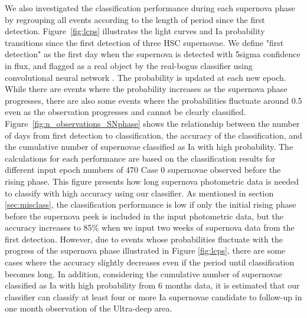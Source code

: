 \documentclass[useamsfonts]{pasj01}
\begin{document}
We also investigated the classification performance during each supernova phase by regrouping all events according to the length of period since the first detection.
Figure\ \ref{fig:lcps} illustrates the light curves and Ia probability transitions since the first detection of three HSC supernovae.
We define "first detection" as the first day when the supernova is detected with 5sigma confidence in flux, and flagged as a real object by the real-bogus classifier using convolutional neural network \citep{yasuda19a}.
The probability is updated at each new epoch.
While there are events where the probability increases as the supernova phase progresses, there are also some events where the probabilities fluctuate around 0.5 even as the observation progresses and cannot be clearly classified.
Figure\ \ref{fig:n_observations_SNphase} shows the relationship between the number of days from first detection to classification, the accuracy of the classification, and the cumulative number of supernovae classified as Ia with high probability.
The calculations for each performance are based on the classification results for different input epoch numbers of 470 Case 0 supernovae observed before the rising phase.
This figure presents how long supernova photometric data is needed to classify with high accuracy using our classifier.
As mentioned in section \ref{sec:misclass}, the classification performance is low if only the initial rising phase before the supernova peek is included in the input photometric data, but the accuracy increases to 85\% when we input two weeks of supernova data from the first detection.
However, due to events whose probabilities fluctuate with the progress of the supernova phase illustrated in Figure \ref{fig:lcps}, there are some cases where the accuracy slightly decreases even if the period until classification becomes long.
In addition, considering the cumulative number of supernovae classified as Ia with high probability from 6 months data, it is estimated that our classifier can classify at least four or more Ia supernovae candidate to follow-up in one month observation of the Ultra-deep area.
\end{document}
